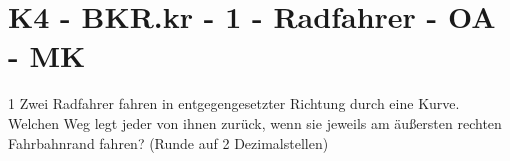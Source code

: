 \section{K4 - BKR.kr - 1 - Radfahrer - OA - MK}

\begin{langesbeispiel} \item[1] %
Zwei Radfahrer fahren in entgegengesetzter Richtung durch eine Kurve. Welchen Weg legt jeder von ihnen zurück, wenn sie jeweils am äußersten rechten Fahrbahnrand fahren? (Runde auf 2 Dezimalstellen)
				\begin{center}
				\end{center}
				
\end{langesbeispiel}